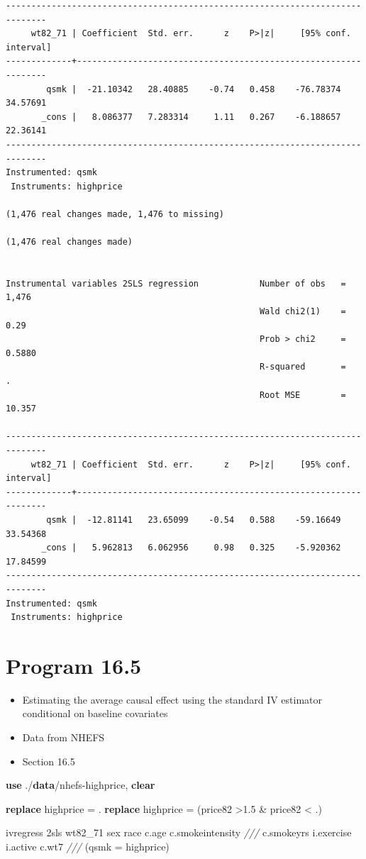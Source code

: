 \documentclass[
  10pt,
]{book}
\newenvironment{Shaded}{\begin{snugshade}}{\end{snugshade}}
\newcommand{\CommentTok}[1]{\textcolor[rgb]{0.56,0.35,0.01}{\textit{#1}}}
\newcommand{\KeywordTok}[1]{\textcolor[rgb]{0.13,0.29,0.53}{\textbf{#1}}}
\newcommand{\NormalTok}[1]{#1}
\providecommand{\tightlist}{%
  \setlength{\itemsep}{0pt}\setlength{\parskip}{0pt}}
\begin{document}
\begin{verbatim}
------------------------------------------------------------------------------
     wt82_71 | Coefficient  Std. err.      z    P>|z|     [95% conf. interval]
-------------+----------------------------------------------------------------
        qsmk |  -21.10342   28.40885    -0.74   0.458    -76.78374    34.57691
       _cons |   8.086377   7.283314     1.11   0.267    -6.188657    22.36141
------------------------------------------------------------------------------
Instrumented: qsmk
 Instruments: highprice

(1,476 real changes made, 1,476 to missing)

(1,476 real changes made)


Instrumental variables 2SLS regression            Number of obs   =      1,476
                                                  Wald chi2(1)    =       0.29
                                                  Prob > chi2     =     0.5880
                                                  R-squared       =          .
                                                  Root MSE        =     10.357

------------------------------------------------------------------------------
     wt82_71 | Coefficient  Std. err.      z    P>|z|     [95% conf. interval]
-------------+----------------------------------------------------------------
        qsmk |  -12.81141   23.65099    -0.54   0.588    -59.16649    33.54368
       _cons |   5.962813   6.062956     0.98   0.325    -5.920362    17.84599
------------------------------------------------------------------------------
Instrumented: qsmk
 Instruments: highprice
\end{verbatim}

\hypertarget{program-16.5-1}{%
\section{Program 16.5}\label{program-16.5-1}}

\begin{itemize}
\tightlist
\item
  Estimating the average causal effect using the standard IV estimator conditional on baseline covariates
\item
  Data from NHEFS
\item
  Section 16.5
\end{itemize}

\begin{Shaded}
\begin{Highlighting}[]
\KeywordTok{use}\NormalTok{ ./}\KeywordTok{data}\NormalTok{/nhefs{-}highprice, }\KeywordTok{clear}

\KeywordTok{replace}\NormalTok{ highprice = .}
\KeywordTok{replace}\NormalTok{ highprice = (price82 \textgreater{}1.5 \& price82 \textless{} .)}

\NormalTok{ivregress 2sls wt82\_71 sex race c.age c.smokeintensity }\CommentTok{///}
\NormalTok{  c.smokeyrs i.exercise i.active c.wt7 }\CommentTok{///}
\NormalTok{  (qsmk = highprice)}
\end{Highlighting}
\end{Shaded}
\end{document}
